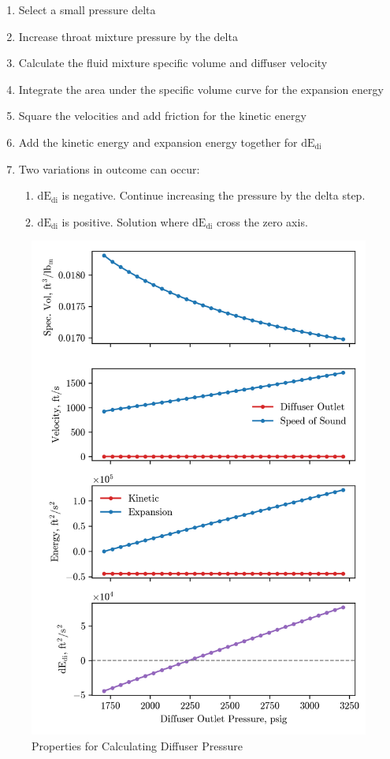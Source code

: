 \documentclass[12 pt]{report}
\newcommand{\dedi}{$\mathrm{dE_{di}}$\xspace}  %
\begin{document}
\begin{enumerate}
    \item Select a small pressure delta
    \item Increase throat mixture pressure by the delta 
    \item Calculate the fluid mixture specific volume and diffuser velocity 
    \item Integrate the area under the specific volume curve for the expansion energy
    \item Square the velocities and add friction for the kinetic energy
    \item Add the kinetic energy and expansion energy together for \dedi{}
    \item Two variations in outcome can occur:
    \begin{enumerate}
        \item \dedi{} is negative. Continue increasing the pressure by the delta step.
        \item \dedi{} is positive. Solution where \dedi{} cross the zero axis.
    \end{enumerate}
\end{enumerate}

\begin{figure}
    \centering
    \includegraphics[scale=1]{figures/diffuser_four.png}
    \caption{Properties for Calculating Diffuser Pressure}
    \label{fig:diff_four}
\end{figure}
\end{document}
